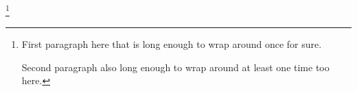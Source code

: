 \footnote{First paragraph here that is
long enough to wrap around once for
sure.

Second paragraph also long enough to
wrap around at least one time too here.}
